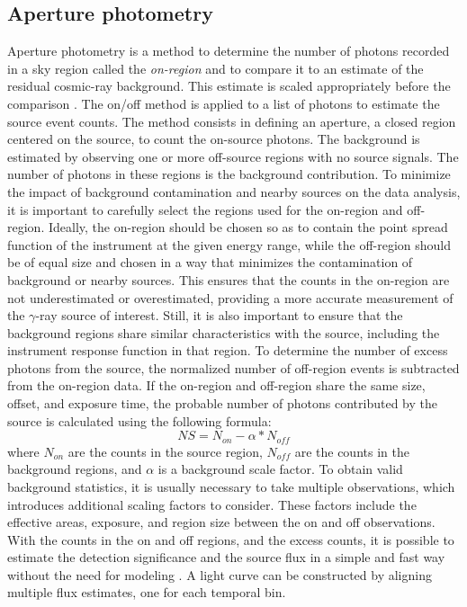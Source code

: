 \subsection{Aperture photometry}
\label{ss:aperture-photometry}
Aperture photometry is a method to determine the number of photons recorded in a sky region 
called the \textit{on-region} and to compare it to an estimate of the residual cosmic-ray background. This estimate is scaled appropriately before the comparison \cite{mohrmann2019}. The on/off method is applied to a list of photons to estimate the source event counts. The method consists in defining an aperture, a closed region centered on the source, to count the on-source photons. The background is estimated by observing one or more off-source regions with no source signals. The number of photons in these regions is the background contribution. To minimize the impact of background contamination and nearby sources on the data analysis, it is important to carefully select the regions used for the on-region and off-region. Ideally, the on-region should be chosen so as to contain the point spread function of the instrument at the given energy range, while the off-region should be of equal size and chosen in a way that minimizes the contamination of background or nearby sources. This ensures that the counts in the on-region are not underestimated or overestimated, providing a more accurate measurement of the $\gamma$-ray source of interest. Still, it is also important to ensure that the background regions share similar characteristics with the source, including the instrument response function in that region. To determine the number of excess photons from the source, the normalized number of off-region events is subtracted from the on-region data. If the on-region and off-region share the same size, offset, and exposure time, the probable number of photons contributed by the source is calculated using the following formula:
$$
NS = N_{on} - \alpha*N_{off}
$$
where $N_{on}$ are the counts in the source region, $N_{off}$ are the counts in the background regions, and $\alpha$ is a background scale factor.
To obtain valid background statistics, it is usually necessary to take multiple observations, which introduces additional scaling factors to consider. These factors include the effective areas, exposure, and region size between the on and off observations. With the counts in the on and off regions, and the excess counts, it is possible to estimate the detection significance and the source flux in a simple and fast way without the need for modeling \cite{tampieri2020real}. A light curve can be constructed by aligning multiple flux estimates, one for each temporal bin.

